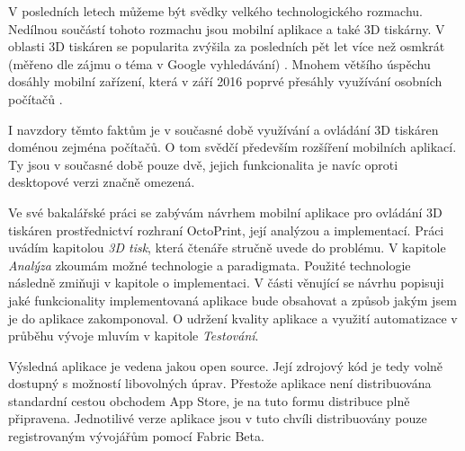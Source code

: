 V posledních letech můžeme být svědky velkého technologického rozmachu.
Nedílnou součástí tohoto rozmachu jsou mobilní aplikace a také 3D tiskárny.
V oblasti 3D tiskáren se popularita zvýšila za posledních pět let více než osmkrát (měřeno dle zájmu o téma v Google vyhledávání) \cite{3d-print-google-trends}.
Mnohem většího úspěchu dosáhly mobilní zařízení, která v září 2016 poprvé přesáhly využívání osobních počítačů \cite{mobile-devices-market-share}.

I navzdory těmto faktům je v současné době využívání a ovládání 3D tiskáren doménou zejména počítačů.
O tom svědčí především rozšíření mobilních aplikací.
Ty jsou v současné době pouze dvě, jejich funkcionalita je navíc oproti desktopové verzi značně omezená.

Ve své bakalářské práci se zabývám návrhem mobilní aplikace pro ovládání 3D tiskáren prostřednictví rozhraní OctoPrint, její analýzou a implementací.
Práci uvádím kapitolou \textit{3D tisk}, která čtenáře stručně uvede do problému.
V kapitole \textit{Analýza} zkoumám možné technologie a paradigmata.
Použité technologie následně zmiňuji v kapitole o implementaci.
V části věnující se návrhu popisuji jaké funkcionality implementovaná aplikace bude obsahovat a způsob jakým jsem je do aplikace zakomponoval.
O udržení kvality aplikace a využití automatizace v průběhu vývoje mluvím v kapitole \textit{Testování}.

Výsledná aplikace je vedena jakou open source.
Její zdrojový kód je tedy volně dostupný s možností libovolných úprav.
Přestože aplikace není distribuována standardní cestou obchodem App Store, je na tuto formu distribuce plně připravena.
Jednotilivé verze aplikace jsou v tuto chvíli distribuovány pouze registrovaným vývojářům pomocí Fabric Beta.
